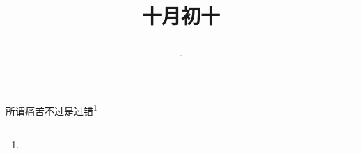 \title{\date[d=10,m=11,y=2024][year:cn-y,年,month:cn,day:cn,日,·,weekday]·十月初十 }
所谓痛苦不过是过错\footnote{ }

